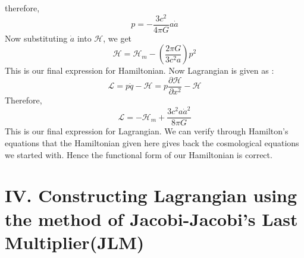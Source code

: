 \documentclass[14pt]{extarticle}
\begin{document}
therefore,\\
\begin{equation}
p=-\frac{3 c^{2}}{4 \pi G} a \dot{a}
\end{equation}
Now substituting $\dot{a}$ into $\mathcal{H}$, we get\\
\begin{equation}
\mathcal{H}=\mathcal{H}_{m} - \left(\frac{2 \pi G}{3 c^{2} a}\right) p^{2}
\end{equation}
This is our final expression for Hamiltonian. Now Lagrangian is given as :
\begin{equation}
\mathcal{L} = p\dot{q} - \mathcal{H}= p \frac{\partial \mathcal{H}}{\partial x^{2}} - \mathcal{H}
\end{equation}
Therefore,\\
\begin{equation}
\mathcal{L} = -\mathcal{H}_{m} + \frac{3 c^{2} a \dot{a}^{2}}{8 \pi G}
\end{equation}
This is our final expression for Lagrangian. We can verify through Hamilton's equations that the Hamiltonian given here gives back the cosmological equations we started with. Hence the functional form of our Hamiltonian is correct.
\pagebreak

\section*{{$\mathbf{IV}$. Constructing Lagrangian using the method of Jacobi-Jacobi's Last Multiplier(JLM)}}
\end{document}
